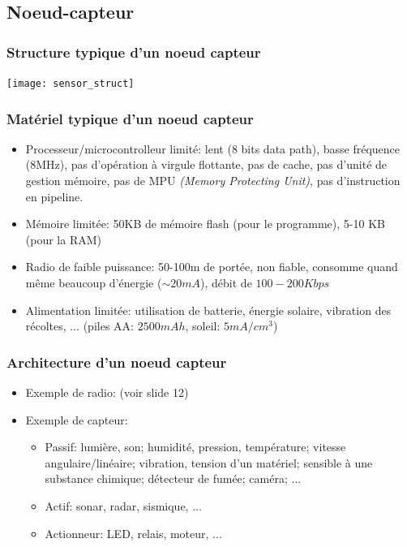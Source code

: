 \documentclass{article}
\begin{document}
\begin{sffamily}
\subsection{Noeud-capteur}
\subsubsection{Structure typique d'un noeud capteur}
\texttt{[image: sensor\_struct]}

\subsubsection{Matériel typique d'un noeud capteur}
\begin{itemize}
\item Processeur/microcontrolleur limité:
  lent (8 bits data path), basse fréquence (8MHz), pas d'opération à virgule
  flottante, pas de cache, pas d'unité de gestion mémoire, pas de MPU \textit{(Memory Protecting Unit)},
  pas d'instruction en pipeline.
\item Mémoire limitée:
  50KB de mémoire flash (pour le programme), 5-10 KB (pour la RAM)
\item Radio de faible puissance:
  50-100m de portée, non fiable, consomme quand même beaucoup d'énergie
  ($\sim 20mA$), débit de $100-200 Kbps$
\item Alimentation limitée:
  utilisation de batterie, énergie solaire, vibration des récoltes, ...
  (piles AA: $2500mAh$, soleil: $5mA/cm^3$)
\end{itemize}

\subsubsection{Architecture d'un noeud capteur}
\begin{itemize}
\item Exemple de radio: (voir slide 12)

\item Exemple de capteur:
  \begin{itemize}
  \item Passif:
    lumière, son;
    humidité, pression, température;
    vitesse angulaire/linéaire;
    vibration, tension d'un matériel;
    sensible à une substance chimique;
    détecteur de fumée;
    caméra; ...
  \item Actif:
    sonar, radar, sismique, ...
  \item Actionneur:
    LED, relais, moteur, ...
  \end{itemize}


\end{itemize}
\end{sffamily}
\end{document}
